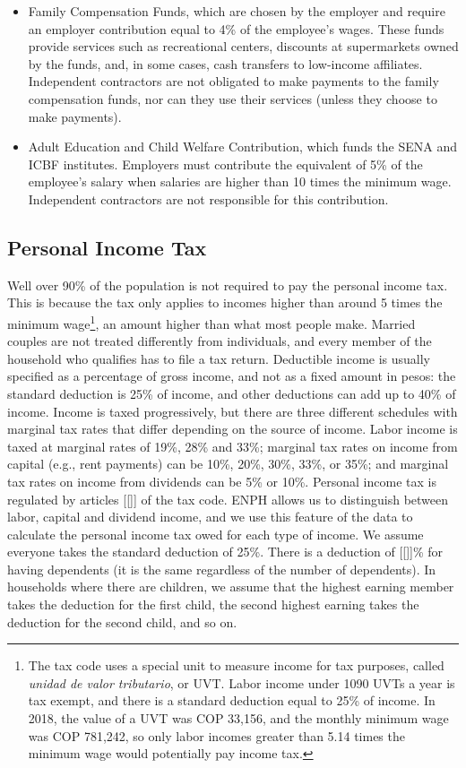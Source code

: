 \documentclass[12pt]{article}
\begin{document}
\begin{appendices}
\begin{itemize}
\item Family Compensation Funds, which are chosen by the employer and require an employer contribution equal to 4\% of the employee's wages.
  These funds provide services such as recreational centers, discounts at supermarkets owned by the funds, and, in some cases, cash transfers to low-income affiliates.
  Independent contractors are not obligated to make payments to the family compensation funds, nor can they use their services (unless they choose to make payments).

\item Adult Education and Child Welfare Contribution, which funds the SENA and ICBF institutes.
  Employers must contribute the equivalent of 5\% of the employee's salary when salaries are higher than 10 times the minimum wage.
  Independent contractors are not responsible for this contribution.

\end{itemize}

\subsection{Personal Income Tax}
Well over 90\% of the population is not required to pay the personal income tax.
This is because the tax only applies to incomes higher than around 5 times the minimum wage\footnote{The tax code uses a special unit to measure income for tax purposes, called \textit{unidad de valor tributario}, or UVT.
  Labor income under 1090 UVTs a year is tax exempt, and there is a standard deduction equal to 25\% of income.
  In 2018, the value of a UVT was COP 33,156, and the monthly minimum wage was COP 781,242, so only labor incomes greater than 5.14 times the minimum wage would potentially pay income tax.},
an amount higher than what most people make.
Married couples are not treated differently from individuals, and every member of the household who qualifies has to file a tax return.
Deductible income is usually specified as a percentage of gross income, and not as a fixed amount in pesos: the standard deduction is 25\% of income, and other deductions can add up to 40\% of income.
Income is taxed progressively, but there are three different schedules with marginal tax rates that differ depending on the source of income.
Labor income is taxed at marginal rates of 19\%, 28\% and 33\%; marginal tax rates on income from capital (e.g., rent payments) can be 10\%, 20\%, 30\%, 33\%, or 35\%; and marginal tax rates on income from dividends can be 5\% or 10\%.
Personal income tax is regulated by articles [[]] of the tax code.
ENPH allows us to distinguish between labor, capital and dividend income, and we use this feature of the data to calculate the personal income tax owed for each type of income.
We assume everyone takes the standard deduction of 25\%.
There is a deduction of [[]]\% for having dependents (it is the same regardless of the number of dependents).
In households where there are children, we assume that the highest earning member takes the deduction for the first child, the second highest earning takes the deduction for the second child, and so on.



\end{appendices}
\end{document}
